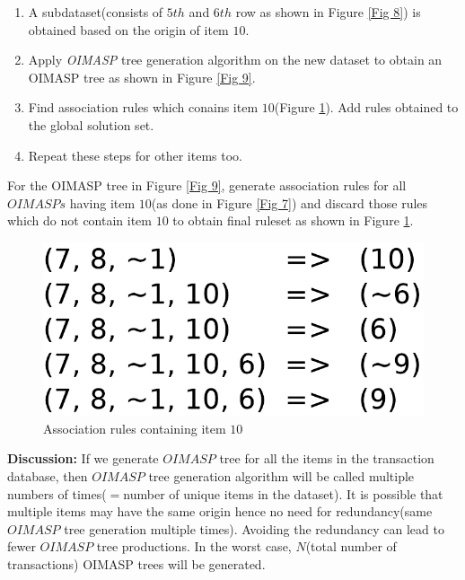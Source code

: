\documentclass[preprint]{elsarticle}
\begin{document}
\begin{enumerate}[Step 1.]
\item A subdataset(consists of $ 5th $ and $ 6th $ row as shown in Figure \ref{Fig 8}) is obtained based on the origin of item $ 10 $.
\item Apply \emph{OIMASP} tree generation algorithm on the new dataset to obtain an OIMASP tree as shown in Figure \ref{Fig 9}.
\item Find association rules which conains item $ 10 $(Figure \ref{Fig 10}). Add rules obtained to the global solution set.
\item Repeat these steps for other items too.
\end{enumerate}

For the OIMASP tree in Figure \ref{Fig 9}, generate association rules for all $ OIMASPs $ having item $ 10 $(as done in Figure \ref{Fig 7}) and discard those rules which do not contain item $ 10 $ to obtain final ruleset as shown in Figure \ref{Fig 10}.

\begin{figure}
\begin{center}
\includegraphics[scale=0.35]{pdf/arules10}
\end{center}
\caption{Association rules containing item $ 10 $}
\label{Fig 10}
\end{figure}

\textbf{Discussion:} If we generate $ OIMASP $ tree for all the items in the transaction database, then $ OIMASP $ tree generation algorithm will be called multiple numbers of times($ = $number of unique items in the dataset). It is possible that multiple items may have the same origin hence no need for redundancy(same $ OIMASP $ tree generation multiple times). Avoiding the redundancy can lead to fewer $ OIMASP $ tree productions. In the worst case, $ N $(total number of transactions) OIMASP trees will be generated.
\end{document}
